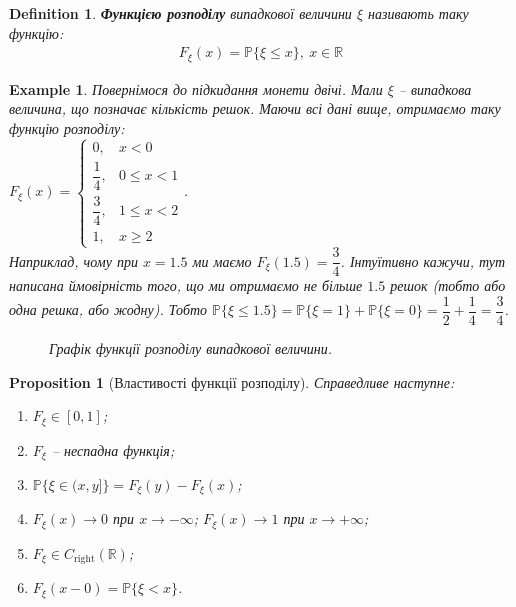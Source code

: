 \documentclass[a4paper, 10pt]{article}
\theoremstyle{theoremdd}
\newtheorem{definition}[theorem]{Definition}
\newtheorem{example}[theorem]{Example}
\newtheorem{proposition}[theorem]{Proposition}
\begin{document}
\begin{definition}
\textbf{Функцією розподілу} випадкової величини $\xi$ називають таку функцію:
\begin{align*}
F_\xi(x) = \mathbb{P}\{\xi \leq x\},\ x \in \mathbb{R}
\end{align*}
\end{definition}

\begin{example}
Повернімося до підкидання монети двічі. Мали $\xi$ -- випадкова величина, що позначає кількість решок. Маючи всі дані вище, отримаємо таку функцію розподілу:\\
$F_{\xi}(x) = \begin{cases} 0, & x < 0 \\ \dfrac{1}{4}, & 0 \leq x < 1 \\ \dfrac{3}{4}, & 1 \leq x < 2 \\ 1, & x \geq 2 \end{cases}$.\\
Наприклад, чому при $x = 1.5$ ми маємо $F_\xi(1.5) = \dfrac{3}{4}$. Інтуїтивно кажучи, тут написана ймовірність того, що ми отримаємо не більше $1.5$ решок (тобто або одна решка, або жодну). Тобто $\mathbb{P}\{\xi \leq 1.5\} = \mathbb{P}\{\xi = 1\} + \mathbb{P}\{\xi = 0\} = \dfrac{1}{2} + \dfrac{1}{4} = \dfrac{3}{4}$.
\begin{figure}[H]
\centering
{}
\caption*{Графік функції розподілу випадкової величини.}
\end{figure}
\end{example}

\begin{proposition}[Властивості функції розподілу]
Справедливе наступне:
\begin{enumerate}[nosep,wide=0pt,label={\arabic*)}]
\item $F_\xi \in [0,1]$;
\item $F_\xi$ -- неспадна функція;
\item $\mathbb{P}\{\xi \in (x,y]\} = F_\xi(y) - F_\xi(x)$;
\item $F_\xi(x) \to 0$ при $x \to -\infty$; \qquad $F_\xi(x) \to 1$ при $x \to +\infty$;
\item $F_\xi \in C_{\text{right}}(\mathbb{R})$; 
\item $F_\xi(x-0) = \mathbb{P}\{\xi < x\}$.
\end{enumerate}
\end{proposition}
\end{document}
